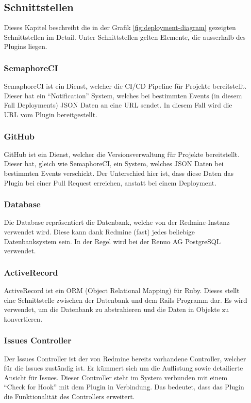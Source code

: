 \subsection{Schnittstellen}
Dieses Kapitel beschreibt die in der Grafik \ref{fig:deployment-diagram} gezeigten Schnittstellen im Detail.
Unter Schnittstellen gelten Elemente, die ausserhalb des Plugins liegen.

\subsubsection{SemaphoreCI}
SemaphoreCI ist ein Dienst, welcher die CI/CD Pipeline für Projekte bereitstellt. Dieser hat ein
\enquote{Notification} System, welches bei bestimmten Events (in diesem Fall Deployments) JSON Daten
an eine URL sendet. In diesem Fall wird die URL vom Plugin bereitgestellt.

\subsubsection{GitHub}
GitHub ist ein Dienst, welcher die Versionsverwaltung für Projekte bereitstellt. Dieser hat, gleich wie
SemaphoreCI, ein System, welches JSON Daten bei bestimmten Events verschickt. Der Unterschied hier ist, dass
diese Daten das Plugin bei einer Pull Request erreichen, anstatt bei einem Deployment.

\subsubsection{Database}
Die Database repräsentiert die Datenbank, welche von der Redmine-Instanz verwendet wird. Diese kann dank
Redmine (fast) jedes beliebige Datenbanksystem sein. In der Regel wird bei der Renuo AG PostgreSQL verwendet.

\subsubsection{ActiveRecord}
ActiveRecord ist ein ORM (Object Relational Mapping) für Ruby. Dieses stellt eine Schnittstelle zwischen der
Datenbank und dem Rails Programm dar. Es wird verwendet, um die Datenbank zu abstrahieren und die Daten
in Objekte zu konvertieren.

\subsubsection{Issues Controller}
Der Issues Controller ist der von Redmine bereits vorhandene Controller, welcher für die Issues zuständig ist.
Er kümmert sich um die Auflistung sowie detailierte Ansicht für Issues. Dieser Controller steht im System
verbunden mit einem \enquote{Check for Hook} mit dem Plugin in Verbindung. Das bedeutet, dass das Plugin die
Funktionalität des Controllers erweitert.

